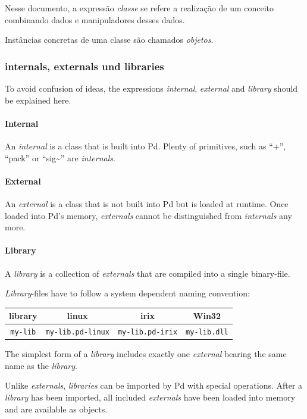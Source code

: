 \documentclass[draft]{ppgmus}
\begin{document}
Nesse documento, a expressão {\em classe} se refere a realização de um
conceito combinando dados e manipuladores desses dados.

Instâncias concretas de uma classe são chamados {\em objetos}.

\subsubsection{internals, externals und libraries}

To avoid confusion of ideas, the expressions {\em internal}, {\em external} and
{\em library} should be explained here.

\paragraph{Internal}
An {\em internal} is a class that is built into Pd.
Plenty of primitives, such as ``+'', ``pack'' or ``sig\~\/'' are {\em internals}.

\paragraph{External}
An {\em external} is a class that is not built into Pd but is loaded at runtime.
Once loaded into Pd's memory, {\em externals} cannot be distinguished from
{\em internals} any more.

\paragraph{Library}
A {\em library} is a collection of {\em externals} that are compiled into a 
single binary-file.

{\em Library}-files have to follow a system dependent naming convention:

\begin{tabular}{c||c|c|c}
library & linux&irix&Win32 \\
\hline
{\tt my-lib}&{\tt  my-lib.pd-linux}&{\tt  my-lib.pd-irix}&
{\tt  my-lib.dll}\\
\end{tabular}

The simplest form of a {\em library} includes exactly one {\em external}
bearing the same name as the {\em library}.

Unlike {\em externals}, {\em libraries} can be imported by Pd with special operations.
After a {\em library} has been imported,
all included {\em externals} have been loaded into memory and are available as objects.
\end{document}
